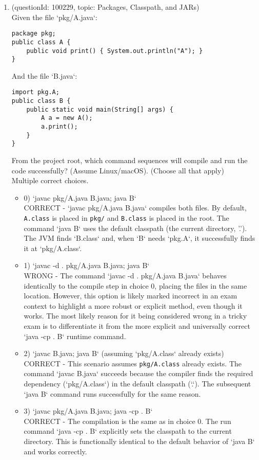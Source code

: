\documentclass[12pt]{article}
\begin{document}
\begin{enumerate}[label=(\arabic*)]
\begin{itemize}
\end{itemize}
\item (questionId: 100229, topic: Packages, Classpath, and JARs) \\ 
Given the file `pkg/A.java`:
\begin{verbatim}
package pkg;
public class A {
    public void print() { System.out.println("A"); }
}
\end{verbatim}
And the file `B.java`:
\begin{verbatim}
import pkg.A;
public class B {
    public static void main(String[] args) {
        A a = new A();
        a.print();
    }
}
\end{verbatim}
From the project root, which command sequences will compile and run the code successfully? (Assume Linux/macOS). (Choose all that apply)
\\ \noindent Multiple correct choices. 
\begin{itemize}
\item 0) `javac pkg/A.java B.java; java B`
 \\ 
CORRECT - `javac pkg/A.java B.java` compiles both files. By default, \verb|A.class| is placed in \verb|pkg/| and \verb|B.class| is placed in the root. The command `java B` uses the default classpath (the current directory, '.'). The JVM finds `B.class` and, when `B` needs `pkg.A`, it successfully finds it at `pkg/A.class`.

\item 1) `javac -d . pkg/A.java B.java; java B`
 \\ 
WRONG - The command `javac -d . pkg/A.java B.java` behaves identically to the compile step in choice 0, placing the files in the same location. However, this option is likely marked incorrect in an exam context to highlight a more robust or explicit method, even though it works. The most likely reason for it being considered wrong in a tricky exam is to differentiate it from the more explicit and universally correct `java -cp . B` runtime command.

\item 2) `javac B.java; java B` (assuming `pkg/A.class` already exists)
 \\ 
CORRECT - This scenario assumes \verb|pkg/A.class| already exists. The command `javac B.java` succeeds because the compiler finds the required dependency (`pkg/A.class`) in the default classpath (`.`). The subsequent `java B` command runs successfully for the same reason.

\item 3) `javac pkg/A.java B.java; java -cp . B`
 \\ 
CORRECT - The compilation is the same as in choice 0. The run command `java -cp . B` explicitly sets the classpath to the current directory. This is functionally identical to the default behavior of `java B` and works correctly.


\end{itemize}
\end{enumerate}
\end{document}
